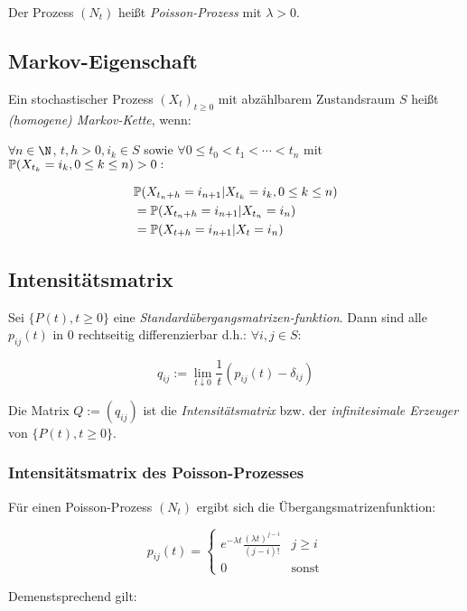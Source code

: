 Der Prozess $(N_t)$ heißt \emph{Poisson-Prozess} mit $\lambda > 0$.

\subsection*{Markov-Eigenschaft}

Ein stochastischer Prozess $(X_t)_{t\geq0}$ mit abzählbarem Zustandsraum $S$ heißt \emph{(homogene) Markov-Kette}, wenn:

$\forall n \in \N$, $t, h > 0, i_k \in S$ sowie $\forall 0 \leq t_0 < t_1 < \cdots < t_n$ mit $\P(X_{t_k} = i_k, 0 \leq k \leq n) > 0 : $

\vspace*{-4mm}
\begin{align*}
&\P(X_{t_n+h} = i_{n+1} | X_{t_k} = i_k, 0 \leq k \leq n) \\
&= \P(X_{t_n+h} = i_{n+1} | X_{t_n} = i_n) \\
&= \P(X_{t+h} = i_{n+1} | X_t = i_n)
\end{align*}

\subsection*{Intensitätsmatrix}

Sei $\{P(t), t \geq 0\}$ eine \emph{Standardübergangsmatrizen-funktion}. Dann sind alle $p_{ij}(t)$ in $0$ rechtseitig differenzierbar d.h.: $\forall i, j \in S :$

\vspace*{-2mm}
\[ q_{ij} := \lim_{t\downarrow0} \frac{1}{t} (p_{ij}(t) - \delta_{ij}) \]

Die Matrix $Q := (q_{ij})$ ist die \emph{Intensitätsmatrix} bzw. der \emph{infinitesimale Erzeuger} von $\{P(t),t \geq 0\}$.

\subsubsection*{Intensitätsmatrix des Poisson-Prozesses}

Für einen Poisson-Prozess $(N_t)$ ergibt sich die Übergangsmatrizenfunktion:

\[ p_{ij}(t) = \begin{cases} e^{-\lambda t} \frac{(\lambda t)^{j-i}}{(j-i)!} & j \geq i \\ 0 & \text{sonst}\end{cases} \]

Demenstsprechend gilt:

